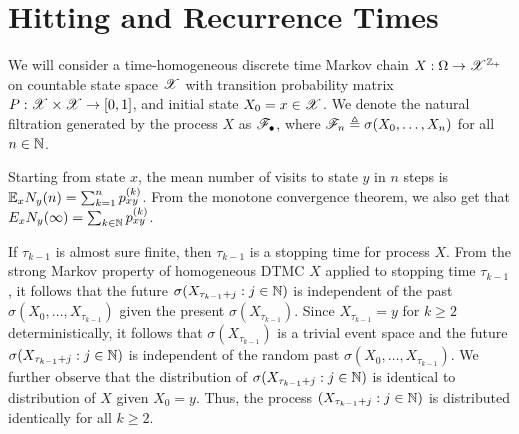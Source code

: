 \documentclass[letterpaper,10pt,english]{article}
\begin{document}
\section{Hitting and Recurrence Times}
We will consider a time-homogeneous discrete time Markov chain $X: \Omega \to \mathscr{X}^{\mathbb{Z}_+}$ on countable state space $\mathscr{X}$ with transition probability matrix $P: \mathscr{X} \times \mathscr{X} \to [0,1]$, 
and initial state $X_0 = x \in \mathscr{X}$. 
We denote the natural filtration generated by the process $X$ as $\mathscr{F}_\bullet$, 
where $\mathscr{F}_n \triangleq \sigma(X_0, \dots, X_n)$ for all $n \in \mathbb{N}$. 
\begin{rem}
Starting from state $x$, the mean number of visits to state $y$ in $n$ steps is $\mathbb{E}_xN_y(n) = \sum_{k=1}^np_{xy}^{(k)}$. 
From the monotone convergence theorem, we also get that 
$E_xN_y(\infty) = \sum_{k \in \mathbb{N}}p_{xy}^{(k)}$. 
\end{rem}
\begin{rem} 
If $\tau_{k-1}$ is almost sure finite, then $\tau_{k-1}$ is a stopping time for process $X$. 
From the strong Markov property of homogeneous DTMC $X$ applied to stopping time $\tau_{k-1}$, 
it follows that the future $\sigma(X_{\tau_{k-1}+j}: j \in \mathbb{N})$ is independent of the past $\sigma(X_0, \dots, X_{\tau_{k-1}})$ given the present $\sigma(X_{\tau_{k-1}})$. 
Since $X_{\tau_{k-1}}= y$ for $k \ge 2$ deterministically, it follows that $\sigma(X_{\tau_{k-1}})$ is a trivial event space and the future $\sigma(X_{\tau_{k-1}+j}: j \in \mathbb{N})$ is independent of the random past $\sigma(X_0, \dots, X_{\tau_{k-1}})$. 
We further observe that the distribution of $\sigma(X_{\tau_{k-1}+j}: j \in \mathbb{N})$ is identical to distribution of $X$ given $X_0= y$. 
Thus, the process $(X_{\tau_{k-1}+j}: j \in \mathbb{N})$ is distributed identically for all $k \ge 2$. 
\end{rem}
\end{document}
